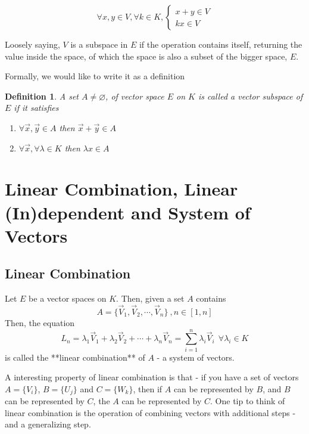 \documentclass{book}
\newtheorem{Definition}{Definition}[section]
\numberwithin{identity}{subsection}
\numberwithin{Rule}{subsection}
\numberwithin{Theorem}{subsection}
\numberwithin{Definition}{subsection}
\begin{document}
\begin{equation}
    \forall x,y\in V, \forall k \in K,
\begin{cases}
x+y\in V \\
k x \in V
\end{cases}
\end{equation}

Loosely saying, $V$ is a subspace in $E$ if the operation contains itself, returning the value inside the space, of which the space is also a subset of the bigger space, $E$. 

Formally, we would like to write it as a definition 

\begin{Definition}
    A set $A\neq \varnothing$, of vector space $E$ on $K$ is called a vector subspace of $E$ if it satisfies
    \begin{enumerate}
        \item $\forall \vec{x},\vec{y}\in A$ then $\vec{x}+\vec{y}\in A$
        \item $\forall \vec{x}, \forall \lambda \in K$ then $\lambda x \in A$
    \end{enumerate}
\end{Definition}

\section{Linear Combination, Linear (In)dependent and System of Vectors}

\subsection{Linear Combination}

Let $E$ be a vector spaces on $K$. Then, given a set $A$ contains $$A=\{\vec{V}_{1}, \vec{V}_{2},\cdots ,\vec{V}_{n} \}\: ,n \in [1,n]$$
Then, the equation $$L_{n} = \lambda_{1} \vec{V}_{1}+ \lambda_{2}\vec{V}_{2}+\cdots+ \lambda_{n}\vec{V}_{n}=\sum\limits_{i=1}^{n}\lambda_{i}\vec{V}_{i}\: \: \forall \lambda_{i}\in K$$ is called the **linear combination** of $A$ - a system of vectors. 

A interesting property of linear combination is that - if you have a set of vectors $A=\{V_{i}\}$, $B=\{U_{j}\}$ and $C=\{W_{k}\}$, then if $A$ can be represented by $B$, and $B$ can be represented by $C$, the $A$ can be represented by $C$. One tip to think of linear combination is the operation of combining vectors with additional steps - and a generalizing step. 
\end{document}
